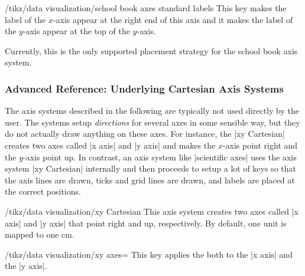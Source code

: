 \begin{key}{/tikz/data visualization/school book axes standard labels}
  This key makes the label of the $x$-axis appear at the right end of
  this axis and it makes the label of the $y$-axis appear at the top
  of the $y$-axis.

  Currently, this is the only supported placement strategy for the
  school book axis system.
\begin{codeexample}[]
\end{codeexample}
\end{key}



\subsubsection{Advanced Reference: Underlying Cartesian Axis Systems}

The axis systems described in the following are typically not used
directly by the user. The systems setup \emph{directions} for several
axes in some sensible way, but they do not actually draw anything on
these axes. For instance, the |xy Cartesian| creates two axes called
|x axis| and |y axis| and makes the $x$-axis point right and the
$y$-axis point up. In contrast, an axis system like |scientific axes|
uses the axis system |xy Cartesian| internally and then proceeds to
setup a lot of keys so that the axis lines are drawn,
ticks and grid lines are drawn, and labels are placed at the correct
positions.

\begin{key}{/tikz/data visualization/xy Cartesian}
  This axis system creates two axes called |x axis| and |y axis| that
  point right and up, respectively. By default, one unit is mapped to
  one cm.

\begin{codeexample}[]
\end{codeexample}


  \begin{key}{/tikz/data visualization/xy axes=}
    This key applies the  both to the |x axis| and the
    |y axis|.
  \end{key}

\end{key}


